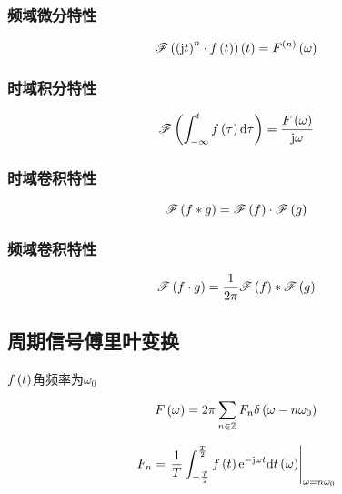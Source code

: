 \documentclass{article}
\begin{document}
\subsubsection{频域微分特性}

\[\mathscr F\left(\left(\mathrm j t\right)^n\cdot f\left(t\right)\right)\left(t\right)=F^{\left(n\right)}\left(\omega\right)\]

\subsubsection{时域积分特性}

\[\mathscr F\left(\int_{-\infty}^tf\left(\tau\right)\mathrm d\tau\right)=\frac{F\left(\omega\right)}{\mathrm j\omega}\]

\subsubsection{时域卷积特性}

\[\mathscr F\left(f\ast g\right)=\mathscr F\left(f\right)\cdot\mathscr F\left(g\right)\]

\subsubsection{频域卷积特性}

\[\mathscr F\left(f\cdot g\right)=\frac1{2\pi}\mathscr F\left(f\right)\ast\mathscr F\left(g\right)\]

\subsection{周期信号傅里叶变换}

$f\left(t\right)$角频率为$\omega_0$

\[F\left(\omega\right)=2\pi\sum_{n\in\mathbb Z}F_n\delta\left(\omega-n\omega_0\right)\]

\[F_n=\left.\frac1T\int_{-\frac T2}^{\frac T2}f\left(t\right)\mathrm e^{-\mathrm j\omega t}\mathrm d t\left(\omega\right)\right|_{\omega=n\omega_0}\]
\end{document}
